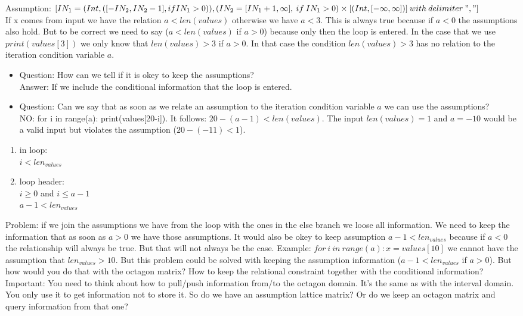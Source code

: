 \documentclass[11pt]{article}
\begin{document}
Assumption: $[IN_1 = (Int, ([-IN_2, IN_2-1], if IN_1 > 0)), (IN_2 = [IN_1+1, \infty],\:if\:IN_1 > 0) \times [(Int, [-\infty, \infty])]\:with\:delimiter\:","]$\\


If x comes from input we have the relation $a < len(values)$ otherwise we have $a < 3$. This is always true because if $a < 0$ the assumptions also hold. But to be correct we need to say ($a < len(values)$ if $a > 0$) because only then the loop is entered. In the case that we use $print(values[3])$ we only know that $len(values) > 3$ if $a > 0$. In that case the condition $len(values) > 3$ has no relation to the iteration condition variable $a$.\\
\begin{itemize}
  \item Question: How can we tell if it is okey to keep the assumptions?\\
  Answer: If we include the conditional information that the loop is entered.
  \item Question: Can we say that as soon as we relate an assumption to the iteration condition variable $a$ we can use the assumptions?\\
  NO: for i in range(a): print(values[20-i]). It follows: $20-(a-1) < len(values)$. The input $len(values) = 1$ and $a = -10$ would be a valid input but violates the assumption ($20-(-11) < 1$).
\end{itemize}


\begin{enumerate}
  \item in loop:\\
  $i < len_{values}$
  
  \item loop header:\\
  $i \geq 0$ and $i \leq a-1$\\
  $a-1 < len_{values}$
\end{enumerate}

Problem: if we join the assumptions we have from the loop with the ones in the else branch we loose all information. We need to keep the information that as soon as $a > 0$ we have those assumptions. It would also be okey to keep assumption $a-1 < len_{values}$ because if $a < 0$ the relationship will always be true. But that will not always be the case. Example: $for\:i\:in\:range(a): x = values[10]$ we cannot have the assumption that $len_{values} > 10$. But this problem could be solved with keeping the assumption information ($a-1 < len_{values}$ if $a > 0$). But how would you do that with the octagon matrix? How to keep the relational constraint together with the conditional information?\\
Important: You need to think about how to pull/push information from/to the octagon domain. It's the same as with the interval domain. You only use it to get information not to store it. So do we have an assumption lattice matrix? Or do we keep an octagon matrix and query information from that one?
\end{document}
